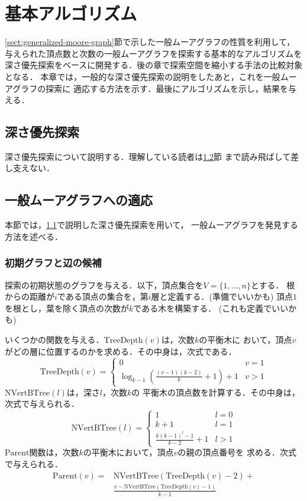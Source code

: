 
\chapter{基本アルゴリズム}
\label{chap:basic-algorithm}
\ref{sect:generalized-moore-graph}節で示した一般ムーアグラフの性質を利用して，
与えられた頂点数と次数の一般ムーアグラフを探索する基本的なアルゴリズムを
深さ優先探索をベースに開発する．後の章で探索空間を縮小する手法の比較対象となる．
本章では，一般的な深さ優先探索の説明をしたあと，これを一般ムーアグラフの探索に
適応する方法を示す．最後にアルゴリズムを示し，結果を与える．

\section{深さ優先探索}
\label{sect:depth-first-search}
深さ優先探索について説明する．理解している読者は\ref{sect:apply-to-gmg}節
まで読み飛ばして差し支えない．

\section{一般ムーアグラフへの適応}
\label{sect:apply-to-gmg}
本節では，\ref{sect:depth-first-search}で説明した深さ優先探索を用いて，
一般ムーアグラフを発見する方法を述べる．

\subsection{初期グラフと辺の候補}
\label{subsect:initial-graph}
探索の初期状態のグラフを与える．以下，頂点集合を$V=\{1,\ldots,n\}$とする．
根からの距離が$i$である頂点の集合を，第$i$層と定義する．(準備でいいかも)
頂点$1$を根とし，葉を除く頂点の次数が$k$である木を構築する．
(これも定義でいいかも)

いくつかの関数を与える．$\mathrm{TreeDepth}(v)$は，次数$k$の平衡木に
おいて，頂点$v$がどの層に位置するのかを求める．その中身は，次式である．
\[ \mathrm{TreeDepth}(v) = \begin{cases}
  0 & v = 1 \\
  \log_{k-1}{(\frac{(v-1)(k-2)}{k}+1)} + 1 & v > 1
\end{cases} \]
$\mathrm{NVertBTree}(l)$は，深さ$l$，次数$k$の
平衡木の頂点数を計算する．その中身は，次式で与えられる．
\[ \mathrm{NVertBTree}(l) = \begin{cases}
  1 & l = 0 \\
  k + 1 & l = 1 \\
  \frac{k(k-1)^l-1}{k-2} + 1 & l > 1
\end{cases} \]
$\mathrm{Parent}$関数は，次数$k$の平衡木において，頂点$v$の親の頂点番号を
求める．次式で与えられる．
\begin{align*}
  \mathrm{Parent}(v)=&\mathrm{NVertBTree}(\mathrm{TreeDepth}(v)-2) +\\
  &\frac{v-\mathrm{NVertBTree}(\mathrm{TreeDepth}(v)-1)}{k-1}
\end{align*}

